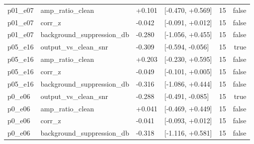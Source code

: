 \begin{tabular}{llllrr}
p01\_e07 & amp\_ratio\_clean & +0.101 & [-0.470, +0.569] & 15 & false \\
p01\_e07 & corr\_z & -0.042 & [-0.091, +0.012] & 15 & false \\
p01\_e07 & background\_suppression\_db & -0.280 & [-1.056, +0.455] & 15 & false \\
p05\_e16 & output\_vs\_clean\_snr & -0.309 & [-0.594, -0.056] & 15 & true \\
p05\_e16 & amp\_ratio\_clean & +0.203 & [-0.230, +0.595] & 15 & false \\
p05\_e16 & corr\_z & -0.049 & [-0.101, +0.005] & 15 & false \\
p05\_e16 & background\_suppression\_db & -0.316 & [-1.086, +0.444] & 15 & false \\
p0\_e06 & output\_vs\_clean\_snr & -0.288 & [-0.491, -0.085] & 15 & true \\
p0\_e06 & amp\_ratio\_clean & +0.041 & [-0.469, +0.449] & 15 & false \\
p0\_e06 & corr\_z & -0.041 & [-0.093, +0.012] & 15 & false \\
p0\_e06 & background\_suppression\_db & -0.318 & [-1.116, +0.581] & 15 & false \\
\bottomrule
\end{tabular}
